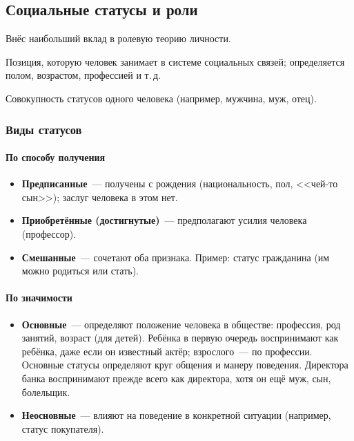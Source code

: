 \documentclass[12pt]{article}
\begin{document}
	\subsection{Социальные статусы и роли}

	\begin{person}
		Внёс наибольший вклад в ролевую теорию личности.
	\end{person}

	\begin{definition}
		Позиция, которую человек занимает в системе социальных связей; определяется полом, возрастом, профессией и т.\,д.
	\end{definition}

	\begin{definition}
		Совокупность статусов одного человека (например, мужчина, муж, отец).
	\end{definition}

	\subsubsection{Виды статусов}

	\paragraph{По способу получения}
	\begin{itemize}
		\item \textbf{Предписанные}~--- получены с рождения (национальность, пол, <<чей-то сын>>); заслуг человека в этом нет.
		\item \textbf{Приобретённые (достигнутые)}~--- предполагают усилия человека (профессор).
		\item \textbf{Смешанные}~--- сочетают оба признака. Пример: статус гражданина (им можно родиться или стать).
	\end{itemize}

	\paragraph{По значимости}
	\begin{itemize}
		\item \textbf{Основные}~--- определяют положение человека в обществе: профессия, род занятий, возраст (для детей). Ребёнка в первую очередь воспринимают как ребёнка, даже если он известный актёр; взрослого~--- по профессии. Основные статусы определяют круг общения и манеру поведения. Директора банка воспринимают прежде всего как директора, хотя он ещё муж, сын, болельщик.
		\item \textbf{Неосновные}~--- влияют на поведение в конкретной ситуации (например, статус покупателя).
	\end{itemize}
\end{document}

